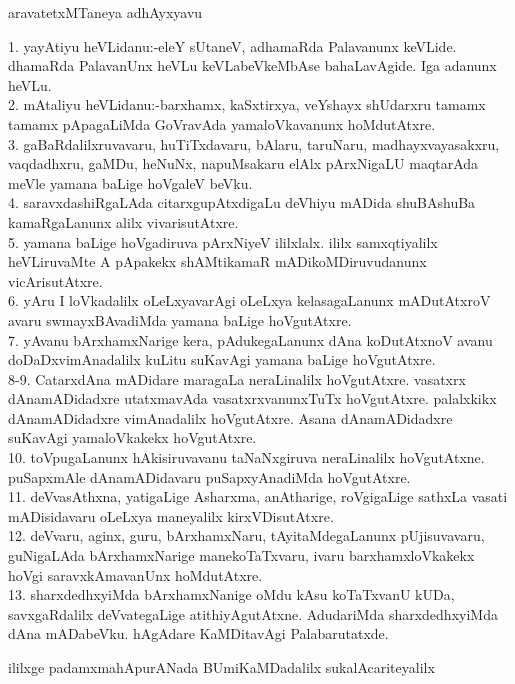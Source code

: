 \documentclass{article}
\begin{document}
\begin{center}
aravatetxMTaneya adhAyxyavu
\end{center}

1. yayAtiyu heVLidanu:-eleY sUtaneV, adhamaRda Palavanunx keVLide. dhamaRda PalavanUnx heVLu keVLabeVkeMbAse bahaLavAgide. Iga adanunx heVLu.\\
2. mAtaliyu heVLidanu:-barxhamx, kaSxtirxya, veYshayx shUdarxru tamamx tamamx pApagaLiMda GoVravAda yamaloVkavanunx hoMdutAtxre.\\
3. gaBaRdalilxruvavaru, huTiTxdavaru, bAlaru, taruNaru, madhayxvayasakxru, vaqdadhxru, gaMDu, heNuNx, napuMsakaru elAlx pArxNigaLU maqtarAda meVle yamana baLige hoVgaleV beVku.\\
4. saravxdashiRgaLAda citarxgupAtxdigaLu deVhiyu mADida shuBAshuBa kamaRgaLanunx alilx vivarisutAtxre.\\
5. yamana baLige hoVgadiruva pArxNiyeV ililxlalx. ililx samxqtiyalilx heVLiruvaMte A pApakekx shAMtikamaR mADikoMDiruvudanunx vicArisutAtxre.\\
6. yAru I loVkadalilx oLeLxyavarAgi oLeLxya kelasagaLanunx mADutAtxroV avaru swmayxBAvadiMda yamana baLige hoVgutAtxre.\\
7. yAvanu bArxhamxNarige kera, pAdukegaLanunx dAna koDutAtxnoV avanu doDaDxvimAnadalilx kuLitu suKavAgi yamana baLige hoVgutAtxre.\\
8-9. CatarxdAna mADidare maragaLa neraLinalilx hoVgutAtxre. vasatxrx dAnamADidadxre utatxmavAda vasatxrxvanunxTuTx hoVgutAtxre. palalxkikx dAnamADidadxre vimAnadalilx hoVgutAtxre. Asana dAnamADidadxre suKavAgi yamaloVkakekx hoVgutAtxre.\\
10. toVpugaLanunx hAkisiruvavanu taNaNxgiruva neraLinalilx hoVgutAtxne. puSapxmAle dAnamADidavaru puSapxyAnadiMda hoVgutAtxre.\\
11. deVvasAthxna, yatigaLige Asharxma, anAtharige, roVgigaLige sathxLa vasati mADisidavaru oLeLxya maneyalilx kirxVDisutAtxre.\\
12. deVvaru, aginx, guru, bArxhamxNaru, tAyitaMdegaLanunx pUjisuvavaru, guNigaLAda bArxhamxNarige manekoTaTxvaru, ivaru barxhamxloVkakekx hoVgi saravxkAmavanUnx hoMdutAtxre.\\
13. sharxdedhxyiMda bArxhamxNanige oMdu kAsu koTaTxvanU kUDa, savxgaRdalilx deVvategaLige atithiyAgutAtxne. AdudariMda sharxdedhxyiMda dAna mADabeVku. hAgAdare KaMDitavAgi Palabarutatxde.\\

\begin{center}
ililxge padamxmahApurANada BUmiKaMDadalilx sukalAcariteyalilx
\end{center}
\end{document}
